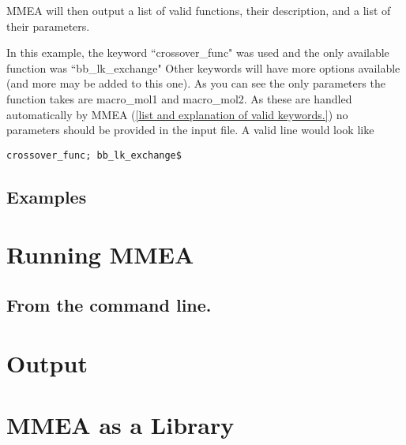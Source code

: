 \documentclass{article}
\begin{document}
MMEA will then output a list of valid functions, their description, and a list of their parameters.


In this example, the keyword ``crossover\_func" was used and the only available function was ``bb\_lk\_exchange" Other keywords will have more options available (and more may be added to this one). As you can see the only parameters the function takes are macro\_mol1 and macro\_mol2. As these are handled automatically by MMEA (\ref{list and explanation of valid keywords.}) no parameters should be provided in the input file. A valid line would look like
\begin{verbatim}
crossover_func; bb_lk_exchange$
\end{verbatim}



\subsection{Examples}


\section{Running MMEA}

\subsection{From the command line.}


\section{Output}

\section{MMEA as a Library}
\end{document}
